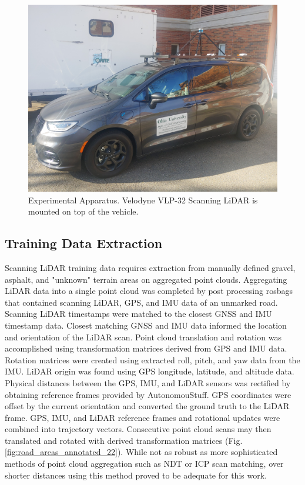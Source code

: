 \documentclass[journal,onecolumn]{IEEEtran}
\begin{document}
			\begin{figure}[H]
				\centering
				\includegraphics[width=0.75\linewidth]{figures/van_on_van}
				\caption[Experimental Apparatus]{Experimental Apparatus. Velodyne VLP-32 Scanning LiDAR is mounted on top of the vehicle.}
				\label{fig:Experimental_Apperatus}
			\end{figure}
	

		\subsection{Training Data Extraction}
	
			{Scanning LiDAR training data requires extraction from manually defined gravel, asphalt, and "unknown" terrain areas on aggregated point clouds. Aggregating LiDAR data into a single point cloud was completed by post processing rosbags that contained scanning LiDAR, GPS, and IMU data of an unmarked road. Scanning LiDAR timestamps were matched to the closest GNSS and IMU timestamp data. Closest matching GNSS and IMU data informed the location and orientation of the LiDAR scan. Point cloud translation and rotation was accomplished using transformation matrices derived from GPS and IMU data. Rotation matrices were created using extracted roll, pitch, and yaw data from the IMU. LiDAR origin was found using GPS longitude, latitude, and altitude data. Physical distances between the GPS, IMU, and LiDAR sensors was rectified by obtaining reference frames provided by AutonomouStuff. GPS coordinates were offset by the current orientation and converted the ground truth to the LiDAR frame. GPS, IMU, and LiDAR reference frames and rotational updates were combined into trajectory vectors. Consecutive point cloud scans may then translated and rotated with derived transformation matrices (Fig. \ref{fig:road_areas_annotated_22}). While not as robust as more sophisticated methods of point cloud aggregation such as NDT or ICP scan matching, over shorter distances using this method proved to be adequate for this work.}
			
\end{document}
